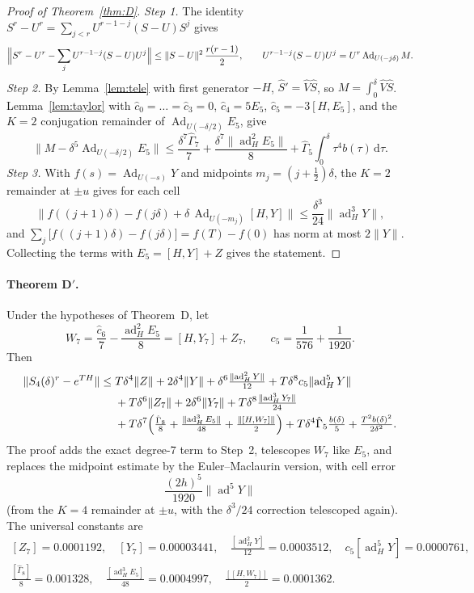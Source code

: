 \documentclass[11pt]{article}
\newcommand{\ad}{\operatorname{ad}}
\newcommand{\Ad}{\operatorname{Ad}}
\newcommand{\norm}[1]{\lVert #1\rVert}
\newcommand{\lb}[1]{[#1]}
\newcommand{\dd}{\,\mathrm{d}}
\theoremstyle{plain}
\theoremstyle{definition}
\theoremstyle{remark}
\begin{document}
\begin{appendices}
\begin{proof}[Proof of Theorem~\ref{thm:D}]
\emph{Step 1.} The identity $S^r-U^r=\sum_{j<r}U^{r-1-j}(S-U)S^j$ gives
\[
\Bigl\lVert S^r-U^r-\sum_jU^{r-1-j}(S-U)U^j\Bigr\rVert\le\norm{S-U}^2\,\frac{r(r-1)}2,
\qquad U^{r-1-j}(S-U)U^j=U^r\Ad_{U(-j\delta)}M .
\]
\emph{Step 2.} By Lemma~\ref{lem:tele} with first generator $-H$, $\hat S'=\hat V\hat S$, so
$M=\int_0^\delta\hat V\hat S$. Lemma~\ref{lem:taylor} with $\hat c_0=\dots=\hat c_3=0$, $\hat c_4=5E_5$,
$\hat c_5=-3[H,E_5]$, and the $K=2$ conjugation remainder of $\Ad_{U(-\delta/2)}E_5$, give
\[
\norm{M-\delta^5\Ad_{U(-\delta/2)}E_5}\le\frac{\delta^7\hat\Gamma_7}7+\frac{\delta^7\norm{\ad_H^2E_5}}8
+\hat\Gamma_5\int_0^\delta\tau^4b(\tau)\dd\tau .
\]
\emph{Step 3.} With $f(s)=\Ad_{U(-s)}Y$ and midpoints $m_j=(j+\frac12)\delta$, the $K=2$ remainder at
$\pm u$ gives for each cell
\[
\norm{f((j{+}1)\delta)-f(j\delta)+\delta\,\Ad_{U(-m_j)}[H,Y]}\le\frac{\delta^3}{24}\norm{\ad_H^3Y},
\]
and $\sum_j\bigl[f((j{+}1)\delta)-f(j\delta)\bigr]=f(T)-f(0)$ has norm at most $2\norm Y$.
Collecting the terms with $E_5=[H,Y]+Z$ gives the statement.
\end{proof}

\paragraph{Theorem D$'$.} Under the hypotheses of Theorem~D, let
\[
W_7=\frac{\hat c_6}7-\frac{\ad_H^2E_5}8=[H,Y_7]+Z_7,\qquad c_5=\frac1{576}+\frac1{1920}.
\]
Then
\[
\begin{aligned}
\norm{S_4(\delta)^r-e^{TH}}\le{}&T\delta^4\norm Z+2\delta^4\norm Y+\delta^6\tfrac{\norm{\ad_H^2Y}}{12}
+T\delta^8c_5\norm{\ad_H^5Y}\\&+T\delta^6\norm{Z_7}+2\delta^6\norm{Y_7}+T\delta^8\tfrac{\norm{\ad_H^3Y_7}}{24}\\
&+T\delta^7\Bigl(\tfrac{\hat\Gamma_8}8+\tfrac{\norm{\ad_H^3E_5}}{48}+\tfrac{\norm{[H,W_7]}}2\Bigr)
+T\delta^4\hat\Gamma_5\tfrac{b(\delta)}5+\tfrac{T^2b(\delta)^2}{2\delta^2}.
\end{aligned}
\]
The proof adds the exact degree-7 term to Step~2, telescopes $W_7$ like $E_5$, and replaces the midpoint
estimate by the Euler--Maclaurin version, with cell error
\[
\frac{(2h)^5}{1920}\norm{\ad^5Y}
\]
(from the $K=4$ remainder at $\pm u$, with the $\delta^3/24$ correction telescoped again). The universal
constants are
\[
\begin{gathered}
\lb{Z_7}=0.0001192,\quad \lb{Y_7}=0.00003441,\quad \tfrac{\lb{\ad_H^2Y}}{12}=0.0003512,\quad
c_5\lb{\ad_H^5Y}=0.0000761,\\
\tfrac{\lb{\hat\Gamma_8}}{8}=0.001328,\quad \tfrac{\lb{\ad_H^3E_5}}{48}=0.0004997,\quad
\tfrac{\lb{[H,W_7]}}{2}=0.0001362 .
\end{gathered}
\]


\end{appendices}
\end{document}
